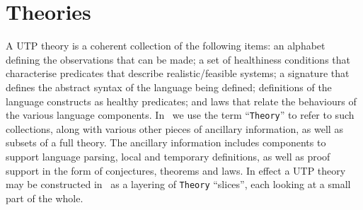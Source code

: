 \section{Theories}\label{sec:theories}


A UTP theory is a coherent collection of the following items:
an alphabet defining the observations that can be made;
a set of healthiness conditions that characterise predicates that describe
realistic/feasible systems;
a signature that defines the abstract syntax of the language being defined;
definitions of the language constructs as healthy predicates;
and
laws that relate the behaviours of the various language components.
In \ we use the term ``\texttt{Theory}'' to refer to
such collections, along with various other pieces of ancillary information,
as well as subsets of a full theory.
The ancillary information includes components to support
language parsing, local and temporary definitions,
as well as proof support in the form of conjectures, theorems and laws.
In effect a UTP theory may be constructed in \ as
a layering of \texttt{Theory} ``slices'', each looking at a small part of the whole.

